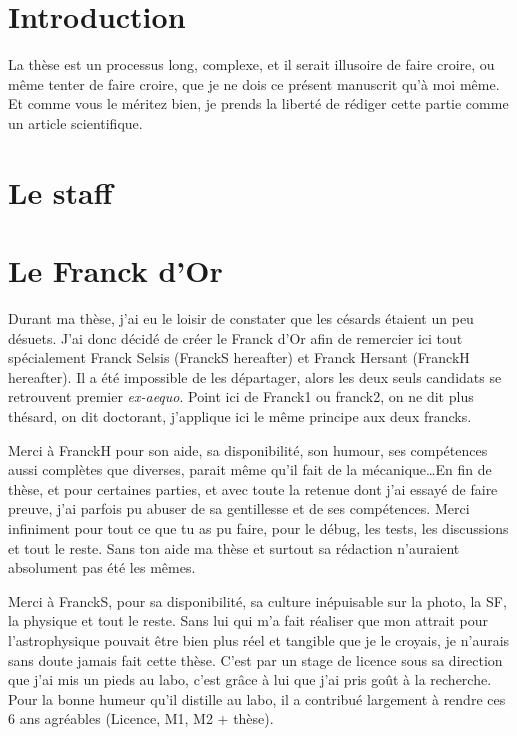 \section{Introduction}
La thèse est un processus long, complexe, et il serait illusoire de faire croire, ou même tenter de faire croire, que je ne dois ce présent manuscrit qu'à moi même. Et comme vous le méritez bien, je prends la liberté de rédiger cette partie comme un article scientifique. 

\section{Le staff}


\section{Le Franck d'Or}
Durant ma thèse, j'ai eu le loisir de constater que les césards étaient un peu désuets. J'ai donc décidé de créer le Franck d'Or afin de remercier ici tout spécialement Franck Selsis (FranckS hereafter) et Franck Hersant (FranckH hereafter). Il a été impossible de les départager, alors les deux seuls candidats se retrouvent premier \textit{ex-aequo}. Point ici de Franck1 ou franck2, on ne dit plus thésard, on dit doctorant, j'applique ici le même principe aux deux francks. 

Merci à FranckH pour son aide, sa disponibilité, son humour, ses compétences aussi complètes que diverses, parait même qu'il fait de la mécanique\dots En fin de thèse, et pour certaines parties, et avec toute la retenue dont j'ai essayé de faire preuve, j'ai parfois pu abuser de sa gentillesse et de ses compétences. Merci infiniment pour tout ce que tu as pu faire, pour le débug, les tests, les discussions et tout le reste. Sans ton aide ma thèse et surtout sa rédaction n'auraient absolument pas été les mêmes. 

Merci à FranckS, pour sa disponibilité, sa culture inépuisable sur la photo, la SF, la physique et tout le reste. Sans lui qui m'a fait réaliser que mon attrait pour l'astrophysique pouvait être bien plus réel et tangible que je le croyais, je n'aurais sans doute jamais fait cette thèse. C'est par un stage de licence sous sa direction que j'ai mis un pieds au labo, c'est grâce à lui que j'ai pris goût à la recherche. Pour la bonne humeur qu'il distille au labo, il a contribué largement à rendre ces 6 ans agréables (Licence, M1, M2 + thèse).


